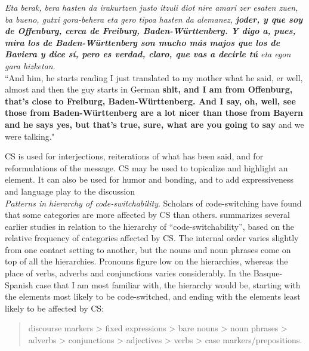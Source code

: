 \documentclass[output=paper,
modfonts
]{langscibook}
\begin{document}
\begin{exe}
\label{reported}
\begin{ex}
\textit {Eta berak, bera hasten da irakurtzen justo itzuli diot nire amari zer esaten zuen, ba bueno, gutxi gora-behera eta gero tipoa hasten da alemanez, \textbf{joder, y que soy de Offenburg, cerca de Freiburg, Baden-Württenberg.  Y digo a, pues, mira los de Baden-Württenberg son mucho más majos que los de Baviera y dice sí, pero es verdad, claro, que vas a decirle  tú} eta egon gara hizketan}.\\
“And him, he starts reading I just translated to my mother what he said, er well, almost and then the guy starts in German \textbf{shit, and I am from Offenburg, that’s close to Freiburg, Baden-Württenberg. And I say, oh, well, see those from Baden-Württenberg are a lot nicer than those from Bayern and he says yes, but that’s true, sure, what are you going to say} and we were talking."
\end{ex}
\end{exe}


CS is used for interjections, reiterations of what has been said, and for reformulations of the message. CS may be used to topicalize and highlight an element. It can also be used for humor and bonding, and to add expressiveness and language play to the discussion \parencite[pp. 85]{gumperz1982discourse,auer1988conversation,gardner2009code} \\

\textit{Patterns in hierarchy of code-switchability}. Scholars of code-switching have found that some categories are more affected by CS than others. \cite[pp. 133]{matras2009language} summarizes several earlier studies in relation to the hierarchy of “code-switchability”, based on the relative frequency of categories affected by CS. The internal order varies slightly from one contact setting to another, but the nouns and noun phrases come on top of all the hierarchies. Pronouns figure low on the hierarchies, whereas the place of verbs, adverbs and conjunctions varies considerably. In the Basque-Spanish case that I am most familiar with, the hierarchy would be, starting with the elements most likely to be code-switched, and ending with the elements least likely to be affected by CS:

\begin{quote}
discourse markers > fixed expressions > bare nouns > noun phrases > adverbs > conjunctions > adjectives > verbs > case markers/prepositions.
\end{quote}
\end{document}
